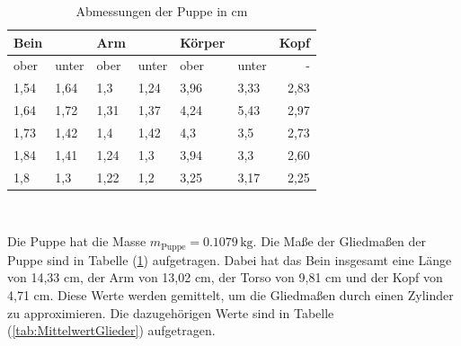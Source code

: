 \begin{table}
  \centering
  \caption{Abmessungen der Puppe in cm}
  \label{tab:Abmessungen}
  \begin{tabular}{llllllr}
    \toprule
    Bein &  & Arm &  & Körper &  &  Kopf\\
    \midrule
               ober &      unter &           ober &      unter & ober &      unter &             - \\
               1,54 &       1,64 &            1,3 &       1,24 & 3,96 &       3,33 &            2,83 \\
               1,64 &       1,72 &           1,31 &       1,37 & 4,24 &       5,43 &            2,97 \\
               1,73 &       1,42 &            1,4 &       1,42 &  4,3 &        3,5 &            2,73 \\
               1,84 &       1,41 &           1,24 &        1,3 & 3,94 &        3,3 &            2,60 \\
                1,8 &        1,3 &           1,22 &        1,2 & 3,25 &       3,17 &            2,25 \\
    \bottomrule
    \end{tabular}\\

\end{table}

Die Puppe hat die Masse $m_{\text{Puppe}} = 0.1079 \, \unit{\kilo\gram}$.
Die Maße der Gliedmaßen der Puppe sind in Tabelle (\ref{tab:Abmessungen}) aufgetragen.
Dabei hat das Bein insgesamt eine Länge von 14,33 cm, der Arm von 13,02 cm, der Torso von 9,81 cm und der Kopf von 4,71 cm.
Diese Werte werden gemittelt, um die Gliedmaßen durch einen Zylinder zu approximieren.
Die dazugehörigen Werte sind in Tabelle (\ref{tab:MittelwertGlieder}) aufgetragen.

